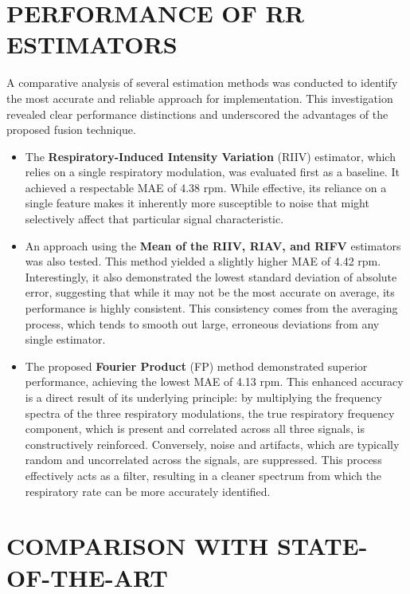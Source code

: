 \documentclass[12pt,a4paper]{report}
\begin{document}
\section{\large{PERFORMANCE OF RR ESTIMATORS}}

 A comparative analysis of several estimation methods was conducted to identify the most accurate and reliable approach for implementation. This investigation revealed clear performance distinctions and underscored the advantages of the proposed fusion technique.
\begin{itemize}
    \item The \textbf{Respiratory-Induced Intensity Variation} (RIIV) estimator, which relies on a single respiratory modulation, was evaluated first as a baseline. It achieved a respectable MAE of 4.38 rpm. While effective, its reliance on a single feature makes it inherently more susceptible to noise that might selectively affect that particular signal characteristic.

    \item An approach using the \textbf{Mean of the RIIV, RIAV, and RIFV} estimators was also tested. This method yielded a slightly higher MAE of 4.42 rpm. Interestingly, it also demonstrated the lowest standard deviation of absolute error, suggesting that while it may not be the most accurate on average, its performance is highly consistent. This consistency comes from the averaging process, which tends to smooth out large, erroneous deviations from any single estimator.

    \item The proposed \textbf{Fourier Product} (FP) method demonstrated superior performance, achieving the lowest MAE of 4.13 rpm. This enhanced accuracy is a direct result of its underlying principle: by multiplying the frequency spectra of the three respiratory modulations, the true respiratory frequency component, which is present and correlated across all three signals, is constructively reinforced. Conversely, noise and artifacts, which are typically random and uncorrelated across the signals, are suppressed. This process effectively acts as a filter, resulting in a cleaner spectrum from which the respiratory rate can be more accurately identified.
    
\end{itemize}

\section{\large{COMPARISON WITH STATE-OF-THE-ART}}
\end{document}
